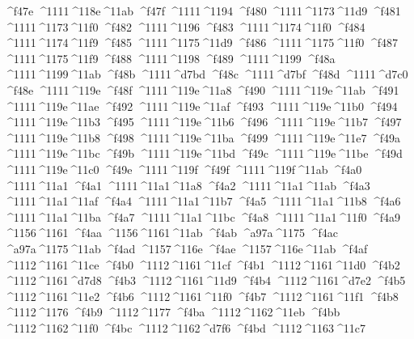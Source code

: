 \checkit ^^^^f47e ^^^^1111^^^^118e^^^^11ab
\checkit ^^^^f47f ^^^^1111^^^^1194
\checkit ^^^^f480 ^^^^1111^^^^1173^^^^11d9
\checkit ^^^^f481 ^^^^1111^^^^1173^^^^11f0
\checkit ^^^^f482 ^^^^1111^^^^1196
\checkit ^^^^f483 ^^^^1111^^^^1174^^^^11f0
\checkit ^^^^f484 ^^^^1111^^^^1174^^^^11f9
\checkit ^^^^f485 ^^^^1111^^^^1175^^^^11d9
\checkit ^^^^f486 ^^^^1111^^^^1175^^^^11f0
\checkit ^^^^f487 ^^^^1111^^^^1175^^^^11f9
\checkit ^^^^f488 ^^^^1111^^^^1198
\checkit ^^^^f489 ^^^^1111^^^^1199
\checkit ^^^^f48a ^^^^1111^^^^1199^^^^11ab
\checkit ^^^^f48b ^^^^1111^^^^d7bd
\checkit ^^^^f48c ^^^^1111^^^^d7bf
\checkit ^^^^f48d ^^^^1111^^^^d7c0
\checkit ^^^^f48e ^^^^1111^^^^119e
\checkit ^^^^f48f ^^^^1111^^^^119e^^^^11a8
\checkit ^^^^f490 ^^^^1111^^^^119e^^^^11ab
\checkit ^^^^f491 ^^^^1111^^^^119e^^^^11ae
\checkit ^^^^f492 ^^^^1111^^^^119e^^^^11af
\checkit ^^^^f493 ^^^^1111^^^^119e^^^^11b0
\checkit ^^^^f494 ^^^^1111^^^^119e^^^^11b3
\checkit ^^^^f495 ^^^^1111^^^^119e^^^^11b6
\checkit ^^^^f496 ^^^^1111^^^^119e^^^^11b7
\checkit ^^^^f497 ^^^^1111^^^^119e^^^^11b8
\checkit ^^^^f498 ^^^^1111^^^^119e^^^^11ba
\checkit ^^^^f499 ^^^^1111^^^^119e^^^^11e7
\checkit ^^^^f49a ^^^^1111^^^^119e^^^^11bc
\checkit ^^^^f49b ^^^^1111^^^^119e^^^^11bd
\checkit ^^^^f49c ^^^^1111^^^^119e^^^^11be
\checkit ^^^^f49d ^^^^1111^^^^119e^^^^11c0
\checkit ^^^^f49e ^^^^1111^^^^119f
\checkit ^^^^f49f ^^^^1111^^^^119f^^^^11ab
\checkit ^^^^f4a0 ^^^^1111^^^^11a1
\checkit ^^^^f4a1 ^^^^1111^^^^11a1^^^^11a8
\checkit ^^^^f4a2 ^^^^1111^^^^11a1^^^^11ab
\checkit ^^^^f4a3 ^^^^1111^^^^11a1^^^^11af
\checkit ^^^^f4a4 ^^^^1111^^^^11a1^^^^11b7
\checkit ^^^^f4a5 ^^^^1111^^^^11a1^^^^11b8
\checkit ^^^^f4a6 ^^^^1111^^^^11a1^^^^11ba
\checkit ^^^^f4a7 ^^^^1111^^^^11a1^^^^11bc
\checkit ^^^^f4a8 ^^^^1111^^^^11a1^^^^11f0
\checkit ^^^^f4a9 ^^^^1156^^^^1161
\checkit ^^^^f4aa ^^^^1156^^^^1161^^^^11ab
\checkit ^^^^f4ab ^^^^a97a^^^^1175
\checkit ^^^^f4ac ^^^^a97a^^^^1175^^^^11ab
\checkit ^^^^f4ad ^^^^1157^^^^116e
\checkit ^^^^f4ae ^^^^1157^^^^116e^^^^11ab
\checkit ^^^^f4af ^^^^1112^^^^1161^^^^11ce
\checkit ^^^^f4b0 ^^^^1112^^^^1161^^^^11cf
\checkit ^^^^f4b1 ^^^^1112^^^^1161^^^^11d0
\checkit ^^^^f4b2 ^^^^1112^^^^1161^^^^d7d8
\checkit ^^^^f4b3 ^^^^1112^^^^1161^^^^11d9
\checkit ^^^^f4b4 ^^^^1112^^^^1161^^^^d7e2
\checkit ^^^^f4b5 ^^^^1112^^^^1161^^^^11e2
\checkit ^^^^f4b6 ^^^^1112^^^^1161^^^^11f0
\checkit ^^^^f4b7 ^^^^1112^^^^1161^^^^11f1
\checkit ^^^^f4b8 ^^^^1112^^^^1176
\checkit ^^^^f4b9 ^^^^1112^^^^1177
\checkit ^^^^f4ba ^^^^1112^^^^1162^^^^11eb
\checkit ^^^^f4bb ^^^^1112^^^^1162^^^^11f0
\checkit ^^^^f4bc ^^^^1112^^^^1162^^^^d7f6
\checkit ^^^^f4bd ^^^^1112^^^^1163^^^^11c7
